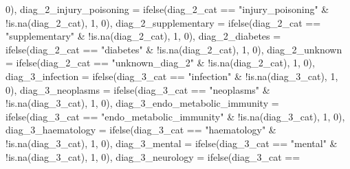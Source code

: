 \documentclass[
]{article}
\newenvironment{Shaded}{\begin{snugshade}}{\end{snugshade}}
\newcommand{\AttributeTok}[1]{\textcolor[rgb]{0.77,0.63,0.00}{#1}}
\newcommand{\DecValTok}[1]{\textcolor[rgb]{0.00,0.00,0.81}{#1}}
\newcommand{\FunctionTok}[1]{\textcolor[rgb]{0.00,0.00,0.00}{#1}}
\newcommand{\NormalTok}[1]{#1}
\newcommand{\SpecialCharTok}[1]{\textcolor[rgb]{0.00,0.00,0.00}{#1}}
\newcommand{\StringTok}[1]{\textcolor[rgb]{0.31,0.60,0.02}{#1}}
\begin{document}
\begin{Shaded}
\begin{Highlighting}[]
            \DecValTok{0}\NormalTok{), }\AttributeTok{diag\_2\_injury\_poisoning =} \FunctionTok{ifelse}\NormalTok{(diag\_2\_cat }\SpecialCharTok{==}
            \StringTok{"injury\_poisoning"} \SpecialCharTok{\&} \SpecialCharTok{!}\FunctionTok{is.na}\NormalTok{(diag\_2\_cat),}
            \DecValTok{1}\NormalTok{, }\DecValTok{0}\NormalTok{), }\AttributeTok{diag\_2\_supplementary =} \FunctionTok{ifelse}\NormalTok{(diag\_2\_cat }\SpecialCharTok{==}
            \StringTok{"supplementary"} \SpecialCharTok{\&} \SpecialCharTok{!}\FunctionTok{is.na}\NormalTok{(diag\_2\_cat), }\DecValTok{1}\NormalTok{,}
            \DecValTok{0}\NormalTok{), }\AttributeTok{diag\_2\_diabetes =} \FunctionTok{ifelse}\NormalTok{(diag\_2\_cat }\SpecialCharTok{==}
            \StringTok{"diabetes"} \SpecialCharTok{\&} \SpecialCharTok{!}\FunctionTok{is.na}\NormalTok{(diag\_2\_cat), }\DecValTok{1}\NormalTok{, }\DecValTok{0}\NormalTok{),}
        \AttributeTok{diag\_2\_unknown =} \FunctionTok{ifelse}\NormalTok{(diag\_2\_cat }\SpecialCharTok{==} \StringTok{"unknown\_diag\_2"} \SpecialCharTok{\&}
            \SpecialCharTok{!}\FunctionTok{is.na}\NormalTok{(diag\_2\_cat), }\DecValTok{1}\NormalTok{, }\DecValTok{0}\NormalTok{), }\AttributeTok{diag\_3\_infection =} \FunctionTok{ifelse}\NormalTok{(diag\_3\_cat }\SpecialCharTok{==}
            \StringTok{"infection"} \SpecialCharTok{\&} \SpecialCharTok{!}\FunctionTok{is.na}\NormalTok{(diag\_3\_cat), }\DecValTok{1}\NormalTok{, }\DecValTok{0}\NormalTok{),}
        \AttributeTok{diag\_3\_neoplasms =} \FunctionTok{ifelse}\NormalTok{(diag\_3\_cat }\SpecialCharTok{==} \StringTok{"neoplasms"} \SpecialCharTok{\&}
            \SpecialCharTok{!}\FunctionTok{is.na}\NormalTok{(diag\_3\_cat), }\DecValTok{1}\NormalTok{, }\DecValTok{0}\NormalTok{), }\AttributeTok{diag\_3\_endo\_metabolic\_immunity =} \FunctionTok{ifelse}\NormalTok{(diag\_3\_cat }\SpecialCharTok{==}
            \StringTok{"endo\_metabolic\_immunity"} \SpecialCharTok{\&} \SpecialCharTok{!}\FunctionTok{is.na}\NormalTok{(diag\_3\_cat),}
            \DecValTok{1}\NormalTok{, }\DecValTok{0}\NormalTok{), }\AttributeTok{diag\_3\_haematology =} \FunctionTok{ifelse}\NormalTok{(diag\_3\_cat }\SpecialCharTok{==}
            \StringTok{"haematology"} \SpecialCharTok{\&} \SpecialCharTok{!}\FunctionTok{is.na}\NormalTok{(diag\_3\_cat), }\DecValTok{1}\NormalTok{,}
            \DecValTok{0}\NormalTok{), }\AttributeTok{diag\_3\_mental =} \FunctionTok{ifelse}\NormalTok{(diag\_3\_cat }\SpecialCharTok{==}
            \StringTok{"mental"} \SpecialCharTok{\&} \SpecialCharTok{!}\FunctionTok{is.na}\NormalTok{(diag\_3\_cat), }\DecValTok{1}\NormalTok{, }\DecValTok{0}\NormalTok{), }\AttributeTok{diag\_3\_neurology =} \FunctionTok{ifelse}\NormalTok{(diag\_3\_cat }\SpecialCharTok{==}

\end{Highlighting}
\end{Shaded}
\end{document}
